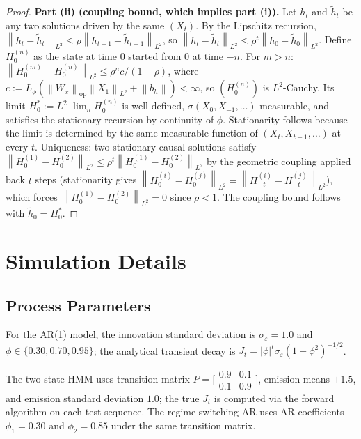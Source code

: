 \documentclass[bj,authoryear]{imsart}
\theoremstyle{plain}
\theoremstyle{definition}
\newcommand{\norm}[1]{\left\lVert #1 \right\rVert}
\begin{document}
\begin{proof}
  \textbf{Part (ii) (coupling bound, which implies part (i)).}
  Let $h_t$ and $\tilde h_t$ be any two solutions driven by the same $(X_t)$.
  By the Lipschitz recursion,
  $\norm{h_t-\tilde h_t}_{L^2}\leq\rho\norm{h_{t-1}-\tilde h_{t-1}}_{L^2}$,
  so $\norm{h_t-\tilde h_t}_{L^2}\leq\rho^t\norm{h_0-\tilde h_0}_{L^2}$.
  Define $H_0^{(n)}$ as the state at time 0 started from $0$ at time $-n$.
  For $m>n$: $\norm{H_0^{(m)}-H_0^{(n)}}_{L^2}\leq\rho^n c/(1-\rho)$,
  where $c:=L_\phi(\norm{W_x}_{\mathrm{op}}\norm{X_1}_{L^2}+\norm{b_h})<\infty$,
  so $(H_0^{(n)})$ is $L^2$-Cauchy.
  Its limit $H_0^*:=L^2\text{-}\lim_n H_0^{(n)}$ is well-defined,
  $\sigma(X_0,X_{-1},\ldots)$-measurable, and satisfies the stationary
  recursion by continuity of $\phi$.  Stationarity follows because the limit
  is determined by the same measurable function of $(X_t,X_{t-1},\ldots)$
  at every $t$.
  Uniqueness: two stationary causal solutions satisfy
  $\norm{H_0^{(1)}-H_0^{(2)}}_{L^2}
  \leq\rho^t\norm{H_0^{(1)}-H_0^{(2)}}_{L^2}$
  by the geometric coupling applied back $t$ steps (stationarity gives
  $\norm{H_0^{(i)}-H_0^{(j)}}_{L^2}=\norm{H_{-t}^{(i)}-H_{-t}^{(j)}}_{L^2}$),
  which forces $\norm{H_0^{(1)}-H_0^{(2)}}_{L^2}=0$ since $\rho<1$.
  The coupling bound follows with $\tilde h_0=H_0^*$.
\end{proof}

\section{Simulation Details}
\label{app:sims}

\subsection{Process Parameters}

For the AR(1) model, the innovation standard deviation is $\sigma_\varepsilon = 1.0$
and $\phi \in \{0.30, 0.70, 0.95\}$; the analytical transient decay is
$J_t = |\phi|^t \sigma_\varepsilon (1-\phi^2)^{-1/2}$.

The two-state HMM uses transition matrix
$P = \bigl[\begin{smallmatrix}0.9&0.1\\0.1&0.9\end{smallmatrix}\bigr]$,
emission means $\pm 1.5$, and emission standard deviation $1.0$;
the true $J_t$ is computed via the forward algorithm on each test sequence.
The regime-switching AR uses AR coefficients $\phi_1 = 0.30$ and $\phi_2 = 0.85$
under the same transition matrix.
\end{document}
